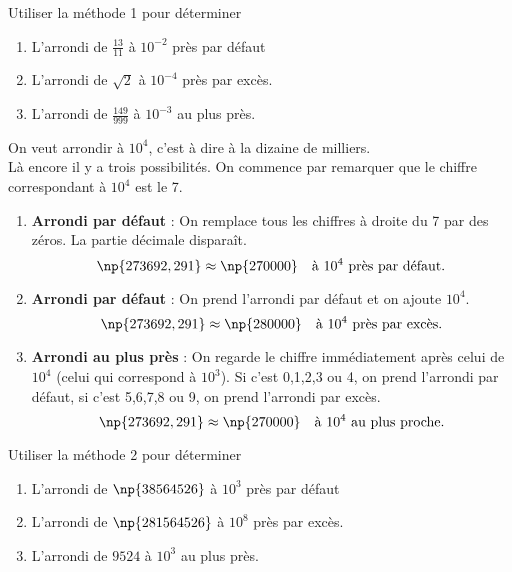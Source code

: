 \documentclass[a4paper,12pt,french]{book}
\begin{document}
\begin{exercice}[]
	Utiliser la méthode 1 pour déterminer
	\begin{enumerate}[\bfseries 1.]
		\item 	L'arrondi de $\frac{13}{11}$ à $10^{-2}$ près par défaut
		\item 	L'arrondi de $\sqrt{2}$ à $10^{-4}$ près par excès.
		\item 	L'arrondi de $\frac{149}{999}$ à $10^{-3}$ au plus près.
	\end{enumerate}
\end{exercice}
\begin{methode}[ 2]
On veut arrondir  à $10^{4}$, c'est à dire à la dizaine de milliers.\\
Là encore il y a trois possibilités. On commence par remarquer que le chiffre correspondant à $10^4$ est le 7.
\begin{enumerate}[\textbullet]
	\item 	\textbf{Arrondi par défaut} : On remplace tous les chiffres à droite du 7 par des zéros. La partie décimale disparaît.
	$$ \np{273692,291}\approx \np{270000}\quad\textrm{à }10^{4}\textrm{ près par défaut.}$$
	\item  	\textbf{Arrondi par défaut} : On prend l'arrondi par défaut et on ajoute $10^4$.
		$$ \np{273692,291}\approx \np{280000}\quad\textrm{à }10^{4}\textrm{ près par excès.}$$
	\item 	\textbf{Arrondi au plus près} : On regarde le chiffre immédiatement après celui de $10^4$ (celui qui correspond
									 à $10^{3}$). Si c'est 0,1,2,3 ou 4, on prend l'arrondi par défaut, si c'est 5,6,7,8 ou 9, on prend l'arrondi
									par excès.
			$$ \np{273692,291}\approx \np{270000}\quad\textrm{à }10^{4}\textrm{ au plus proche.}$$
\end{enumerate}
\end{methode}

\begin{exercice}[]
	Utiliser la méthode 2 pour déterminer
	\begin{enumerate}[\bfseries 1.]
		\item 	L'arrondi de $\np{38564526}$ à $10^3$ près par défaut
		\item 	L'arrondi de $\np{281 564 526}$ à $10^8$ près par excès.
		\item 	L'arrondi de $9524$ à $10^{3}$ au plus près.
	\end{enumerate}
\end{exercice}
\end{document}
